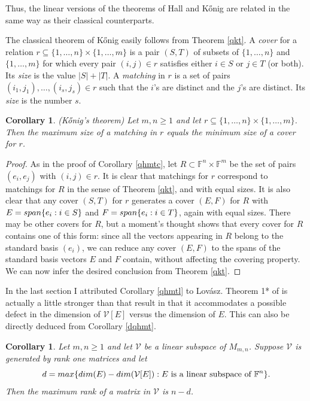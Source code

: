 \documentclass[10pt,a4paper]{amsart}
\newtheorem{cor}[thm]{Corollary}
\begin{document}
Thus, the linear versions of the theorems of Hall and Kőnig are related in the same way as their classical counterparts.

The classical theorem of Kőnig easily follows from Theorem \ref{qkt}. A {\it cover} for a relation $r \subseteq \{1, \ldots, n\} \times \{1, \ldots, m\}$ is a pair $(S, T)$ of subsets of $\{1, \ldots, n\}$ and $\{1, \ldots, m\}$ for which every pair $(i,j) \in r$ satisfies either $i \in S$ or $j \in T$ (or both). Its {\it size} is the value $|S| + |T|$. A {\it matching} in $r$ is a set of pairs $(i_1, j_1), \ldots, (i_s, j_s) \in r$ such that the $i$'s are distinct and the $j$'s are distinct. Its {\it size} is the number $s$.

\begin{cor} (Kőnig's theorem)
Let $m, n \geq 1$ and let $r \subseteq \{1, \ldots, n\}\times \{1, \ldots, m\}$. Then the maximum size of a matching in $r$ equals the minimum size of a cover for $r$.
\end{cor}

\begin{proof}
As in the proof of Corollary \ref{qhmtc}, let $R \subset \mathbb{F}^n \times \mathbb{F}^m$ be the set of pairs $(e_i, e_j)$ with $(i,j) \in r$. It is clear that matchings for $r$ correspond to matchings for $R$ in the sense of Theorem \ref{qkt}, and with equal sizes. It is also clear that any cover $(S,T)$ for $r$ generates a cover $(E,F)$ for $R$ with $E = {\rm span}\{e_i: i \in S\}$ and $F = {\rm span}\{e_i: i \in T\}$, again with equal sizes. There may be other covers for $R$, but a moment's thought shows that every cover for $R$ contains one of this form: since all the vectors appearing in $R$ belong to the standard basis $(e_i)$, we can reduce any cover $(E, F)$ to the spans of the standard basis vectors $E$ and $F$ contain, without affecting the covering property. We can now infer the desired conclusion from Theorem \ref{qkt}.
\end{proof}

In the last section I attributed Corollary \ref{qhmtl} to Lovász. Theorem 1* of \cite{lovasz} is actually a little stronger than that result in that it accommodates a possible defect in the dimension of $\mathcal{V}[E]$ versus the dimension of $E$. This can also be directly deduced from Corollary \ref{dqhmt}.

\begin{cor}\label{locor} \cite[Theorem 1*]{lovasz}
Let $m, n \geq 1$ and let $\mathcal{V}$ be a linear subspace of $M_{m,n}$. Suppose $\mathcal{V}$ is generated by rank one matrices and let $$d = {\rm max}\{{\rm dim}(E) - {\rm dim}(\mathcal{V}[E]): E\mbox{ is a linear subspace of }\mathbb{F}^n\}.$$ Then the maximum rank of a matrix in $\mathcal{V}$ is $n - d$.
\end{cor}
\end{document}

